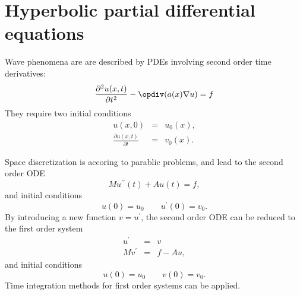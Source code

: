 
\chapter{Hyperbolic partial differential equations}

Wave phenomena are are described by PDEs involving second order time derivatives:
$$
\frac{\partial^2 u(x,t)}{\partial t^2} - \opdiv (a(x) \nabla u) = f
$$
They require two initial conditions 
\begin{eqnarray*}
u(x,0) & = & u_0(x), \\
\frac{\partial u(x,t)}{\partial t} & = & v_0(x).
\end{eqnarray*}

Space discretization is accoring to parablic problems, and lead to the second order
ODE
$$
M u^{\prime \prime}(t) + A u(t) = f,
$$
and initial conditions
$$
u(0) = u_0 \qquad u^\prime(0) = v_0.
$$
By introducing a new function $v = u^\prime$, the second order ODE can be reduced to
the first order system
\begin{eqnarray*}
u^\prime & = & v \\
M v^\prime & = & f - A u,
\end{eqnarray*}
and initial conditions
$$
u(0) = u_0 \qquad v(0) = v_0.
$$
Time integration methods for first order systems can be applied.
